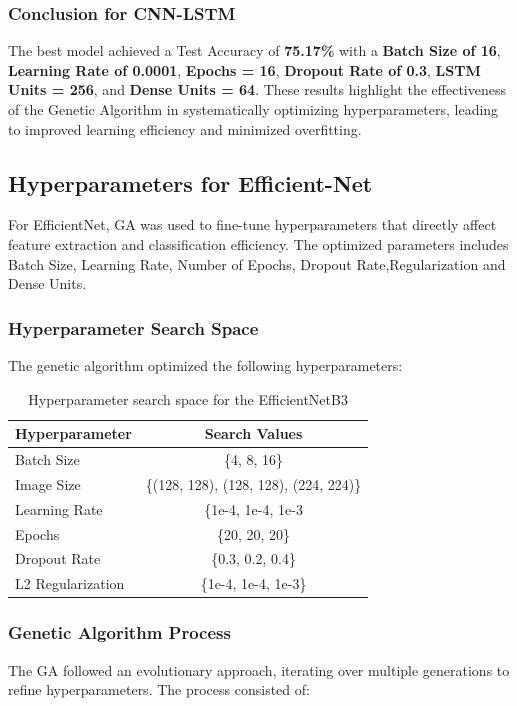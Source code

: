 \subsubsection{Conclusion for CNN-LSTM}
The best model achieved a Test Accuracy of \textbf{75.17\%} with a \textbf{Batch Size of 16}, \textbf{Learning Rate of 0.0001}, \textbf{Epochs = 16}, \textbf{Dropout Rate of 0.3}, \textbf{LSTM Units = 256}, and \textbf{Dense Units = 64}. These results highlight the effectiveness of the Genetic Algorithm in systematically optimizing hyperparameters, leading to improved learning efficiency and minimized overfitting.


\subsection{Hyperparameters for Efficient-Net}
For EfficientNet, GA was used to fine-tune hyperparameters that directly affect feature extraction and classification efficiency. The optimized parameters includes Batch Size, Learning Rate, Number of Epochs, Dropout Rate,Regularization and Dense Units.

\subsubsection{Hyperparameter Search Space}
The genetic algorithm optimized the following hyperparameters:
\begin{table}[h]
      \centering
      \begin{tabular}{|l|c|}
          \hline
          \textbf{Hyperparameter} & \textbf{Search Values} \\
          \hline
          Batch Size & \{4, 8, 16\} \\
          Image Size & \{(128, 128), (128, 128), (224, 224)\} \\
          Learning Rate & \{1e-4, 1e-4, 1e-3} \\
          Epochs & \{20, 20, 20\} \\
          Dropout Rate & \{0.3, 0.2, 0.4\} \\
          L2 Regularization & \{1e-4, 1e-4, 1e-3\} \\
          \hline
      \end{tabular}
      \caption{Hyperparameter search space for the EfficientNetB3}
      \label{tab:search_space}
  \end{table}
  
\subsubsection{Genetic Algorithm Process}
The GA followed an evolutionary approach, iterating over multiple generations to refine hyperparameters. The process consisted of:

